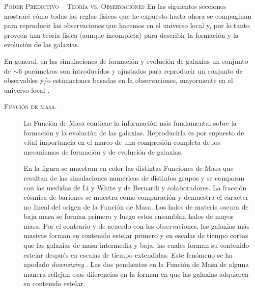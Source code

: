 \documentclass[xcolor=dvipsnames,4pt,hyperref={colorlinks,citecolor=black,linkcolor=black,urlcolor=black}]{beamer}
\begin{document}
\begin{frame}[allowframebreaks]{\textsc{Poder Predictivo -- Teoría vs. Observaciones}}
%
En las siguientes secciones mostraré cómo todas las reglas físicas que he expuesto hasta ahora se
compaginan para reproducir las observaciones que hacemos en el universo local y, por lo tanto
proveen una teoría física (aunque incompleta) para describir la formación y la evolución de las
galaxias.

En general, en las simulaciones de formación y evolución de galaxias un conjunto de $\sim6$
parámetros son introducidos y ajustados para reproducir un conjunto de observables y/o estimaciones
basadas en la observaciones, mayormente en el universo local \citep{Somerville2015, Guo2016,
Naab2016}.

\begin{description}
%
\item[\textsc{Función de masa.}] La Función de Masa contiene la información más fundamental sobre la
formación y la evolución de las galaxias. Reproducirla es por supuesto de vital importancia en el
marco de una compresión completa de los mecanismos de formación y de evolución de galaxias.

En la figura se muestran en color las distintas Funciones de Masa que resultan de las simulaciones
numéricas de distintos grupos y se comparan con las medidas de Li y White y de Bernardi y
colaboradores. La fracción cósmica de bariones se muestra como comparación y demuestra el caracter
no lineal del origen de la Función de Masa. Los halos de materia oscura de baja masa se forman
primero y luego estos ensamblan halos de mayor masa. Por el contrario y de acuerdo con las
observaciones, las galaxias más masivas forman su contenido estelar primero y en escalas de tiempo
cortas que las galaxias de masa intermedia y baja, las cuales forman su contenido estelar después en
escalas de tiempo extendidas. Este fenómeno se ha apodado \emph{downsizing} \citep{Cowie1996}. Las
dos pendientes en la Función de Masa de alguna manera reflejan esas diferencias en la forman en que
las galaxias adquieren su contenido estelar.


\end{description}
\end{frame}
\end{document}
